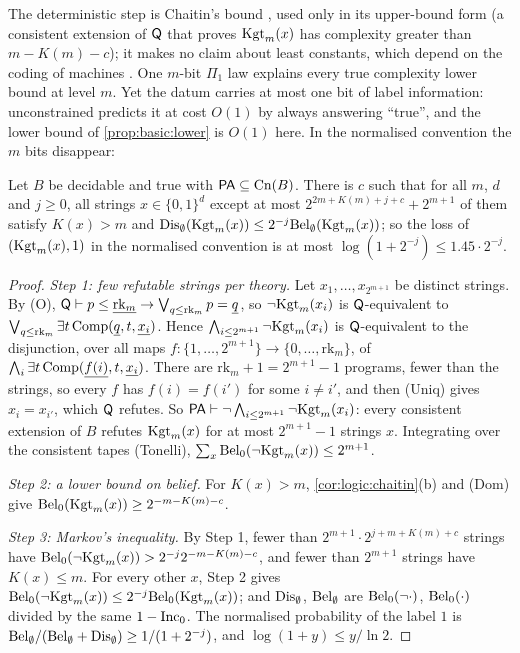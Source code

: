 The deterministic step is Chaitin's bound \citep{chaitin1974information}, used only in its upper-bound form (a consistent extension of $\mathsf{Q}$ that proves $\mathrm{Kgt}_m(x)$ has complexity greater than $m-K(m)-c$); it makes no claim about least constants, which depend on the coding of machines \citep{raatikainen1998interpreting}. One $m$-bit $\Pi_1$ law explains every true complexity lower bound at level $m$. Yet the datum carries at most one bit of label information: unconstrained \SOIabbr predicts it at cost $O(1)$ by always answering ``true'', and the lower bound of \cref{prop:basic:lower} is $O(1)$ here. In the normalised convention the $m$ bits disappear:

\begin{proposition}\label{prop:logic:normalised}
Let $B$ be decidable and true with $\mathsf{PA}\subseteq\mathrm{Cn}(B)$. There is $c$ such that for all $m$, $d$ and $j\ge0$, all strings $x\in\{0,1\}^d$ except at most $2^{2m+K(m)+j+c}+2^{m+1}$ of them satisfy $K(x)>m$ and $\mathrm{Dis}_\emptyset(\mathrm{Kgt}_m(x))\le2^{-j}\mathrm{Bel}_\emptyset(\mathrm{Kgt}_m(x))$; so the loss of $(\mathrm{Kgt}_m(x),1)$ in the normalised convention is at most $\log(1+2^{-j})\le1.45\cdot2^{-j}$.
\end{proposition}

\begin{proof}
\emph{Step 1: few refutable strings per theory.} Let $x_1,\dots,x_{2^{m+1}}$ be distinct strings. By (O), $\mathsf{Q}\vdash p\le\underline{\mathrm{rk}_m}\to\bigvee_{q\le\mathrm{rk}_m}p=\underline{q}$, so $\neg\mathrm{Kgt}_m(x_i)$ is $\mathsf{Q}$-equivalent to $\bigvee_{q\le\mathrm{rk}_m}\exists t\,\mathrm{Comp}(\underline{q},t,\underline{x_i})$. Hence $\bigwedge_{i\le2^{m+1}}\neg\mathrm{Kgt}_m(x_i)$ is $\mathsf{Q}$-equivalent to the disjunction, over all maps $f:\{1,\dots,2^{m+1}\}\to\{0,\dots,\mathrm{rk}_m\}$, of $\bigwedge_i\exists t\,\mathrm{Comp}(\underline{f(i)},t,\underline{x_i})$. There are $\mathrm{rk}_m+1=2^{m+1}-1$ programs, fewer than the strings, so every $f$ has $f(i)=f(i')$ for some $i\ne i'$, and then (Uniq) gives $x_i=x_{i'}$, which $\mathsf{Q}$ refutes. So $\mathsf{PA}\vdash\neg\bigwedge_{i\le2^{m+1}}\neg\mathrm{Kgt}_m(x_i)$: every consistent extension of $B$ refutes $\mathrm{Kgt}_m(x)$ for at most $2^{m+1}-1$ strings $x$. Integrating over the consistent tapes (Tonelli), $\sum_x\mathrm{Bel}_0(\neg\mathrm{Kgt}_m(x))\le2^{m+1}$.

\emph{Step 2: a lower bound on belief.} For $K(x)>m$, \cref{cor:logic:chaitin}(b) and (Dom) give $\mathrm{Bel}_0(\mathrm{Kgt}_m(x))\ge2^{-m-K(m)-c}$.

\emph{Step 3: Markov's inequality.} By Step 1, fewer than $2^{m+1}\cdot2^{j+m+K(m)+c}$ strings have $\mathrm{Bel}_0(\neg\mathrm{Kgt}_m(x))>2^{-j}2^{-m-K(m)-c}$, and fewer than $2^{m+1}$ strings have $K(x)\le m$. For every other $x$, Step 2 gives $\mathrm{Bel}_0(\neg\mathrm{Kgt}_m(x))\le2^{-j}\mathrm{Bel}_0(\mathrm{Kgt}_m(x))$; and $\mathrm{Dis}_\emptyset$, $\mathrm{Bel}_\emptyset$ are $\mathrm{Bel}_0(\neg\cdot)$, $\mathrm{Bel}_0(\cdot)$ divided by the same $1-\mathrm{Inc}_0$. The normalised probability of the label $1$ is $\mathrm{Bel}_\emptyset/(\mathrm{Bel}_\emptyset+\mathrm{Dis}_\emptyset)\ge1/(1+2^{-j})$, and $\log(1+y)\le y/\ln2$.
\end{proof}

